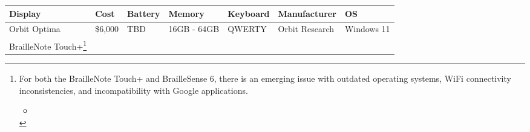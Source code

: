 \documentclass[14pt, letterpaper,twoside]{extreport}
\begin{document}
\begin{longtable}[]{@{}
	>{\raggedright\arraybackslash}p{}
	>{\raggedright\arraybackslash}p{}
	>{\raggedright\arraybackslash}p{}
	>{\raggedright\arraybackslash}p{}
	>{\raggedright\arraybackslash}p{}
	>{\raggedright\arraybackslash}p{}
	>{\raggedright\arraybackslash}p{}@{}
	}
	\toprule\noalign{}

	\textbf{Display}                                                                                                                                                                                                                             & \textbf{Cost}                             & \textbf{Battery} & \textbf{Memory} & \textbf{Keyboard} & \textbf{Manufacturer} & \textbf{OS}                                                                                                                                                                                                                                                                                                                                                                                 \\
	\midrule\noalign{}
	\endhead
	\bottomrule\noalign{}
	\endlastfoot
	Orbit Optima                                                                                                                                                                                                                                 & \$6,000                                   & TBD              & 16GB - 64GB     & QWERTY            & Orbit Research        & Windows 11                                                                                                                                                                                                                                                                                                                                                                                  \\[1.5em]
	BrailleNote Touch+\footnote{For both the BrailleNote Touch+ and BrailleSense 6, there is an emerging issue with outdated operating systems, WiFi connectivity inconsistencies, and incompatibility with Google applications. \begin{itemize}
			                                                                                                                                                                                                                             \item

\end{itemize}}
\end{longtable}
\end{document}
